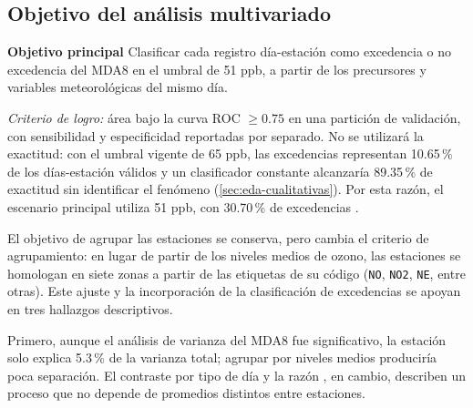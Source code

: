 %

\subsection{Objetivo del análisis multivariado}
\label{sec:obj:objetivo}

\textbf{Objetivo principal} Clasificar cada registro día-estación como
excedencia o no excedencia del MDA8 en el umbral de 51 ppb, a partir de los
precursores y variables meteorológicas del mismo día.

\textit{Criterio de logro:} área bajo la curva ROC $\geq 0.75$ en una
partición de validación, con sensibilidad y especificidad reportadas por
separado. No se utilizará la exactitud: con el umbral vigente de 65 ppb, las
excedencias representan 10.65\,\% de los días-estación válidos y un
clasificador constante alcanzaría 89.35\,\% de exactitud sin identificar el
fenómeno
(\cref{sec:eda-cualitativas}). Por esta razón, el escenario principal utiliza
51 ppb, con 30.70\,\% de excedencias \parencite{saito2015}.

El objetivo de agrupar las estaciones se conserva, pero cambia el criterio de
agrupamiento: en lugar de partir de los niveles medios de ozono, las estaciones
se homologan en siete zonas a partir de las etiquetas de su código
(\texttt{NO}, \texttt{NO2}, \texttt{NE}, entre otras). Este ajuste y la
incorporación de la clasificación de excedencias se apoyan en tres hallazgos
descriptivos.

Primero, aunque el análisis de varianza del MDA8 fue significativo, la
estación solo explica 5.3\,\% de la varianza total; agrupar por niveles medios
produciría poca separación. El contraste por tipo de día y la razón
, en cambio, describen un proceso que no depende de promedios
distintos entre estaciones.

